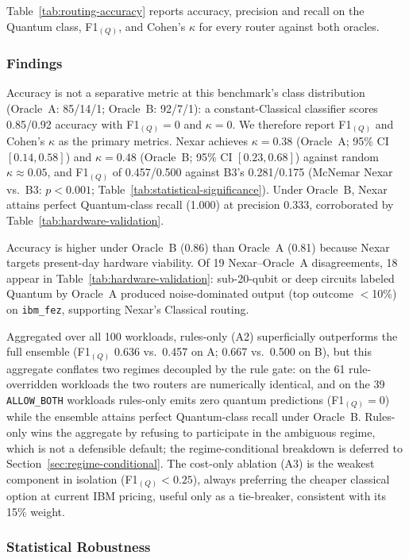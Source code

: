 \documentclass[10pt,conference]{IEEEtran}
\begin{document}
Table~\ref{tab:routing-accuracy} reports accuracy, precision and recall on the Quantum class, F1$_{(Q)}$, and Cohen's $\kappa$ for every router against both oracles.



\subsubsection{Findings}
Accuracy is not a separative metric at this benchmark's class distribution (Oracle~A: 85/14/1; Oracle~B: 92/7/1): a constant-Classical classifier scores 0.85/0.92 accuracy with F1$_{(Q)}{=}0$ and $\kappa{=}0$. We therefore report F1$_{(Q)}$ and Cohen's $\kappa$ as the primary metrics. Nexar achieves $\kappa = 0.38$ (Oracle~A; 95\% CI $[0.14, 0.58]$) and $\kappa = 0.48$ (Oracle~B; 95\% CI $[0.23, 0.68]$) against random $\kappa \approx 0.05$, and F1$_{(Q)}$ of 0.457/0.500 against B3's 0.281/0.175 (McNemar Nexar vs.\ B3: $p{<}0.001$; Table~\ref{tab:statistical-significance}). Under Oracle~B, Nexar attains perfect Quantum-class recall (1.000) at precision 0.333, corroborated by Table~\ref{tab:hardware-validation}.

Accuracy is higher under Oracle~B (0.86) than Oracle~A (0.81) because Nexar targets present-day hardware viability. Of 19 Nexar--Oracle~A disagreements, 18 appear in Table~\ref{tab:hardware-validation}: sub-20-qubit or deep circuits labeled Quantum by Oracle~A produced noise-dominated output (top outcome $<$10\%) on \texttt{ibm\_fez}, supporting Nexar's Classical routing.

Aggregated over all 100 workloads, rules-only (A2) superficially outperforms the full ensemble (F1$_{(Q)}$ 0.636 vs.\ 0.457 on A; 0.667 vs.\ 0.500 on B), but this aggregate conflates two regimes decoupled by the rule gate: on the 61 rule-overridden workloads the two routers are numerically identical, and on the 39 \texttt{ALLOW\_BOTH} workloads rules-only emits zero quantum predictions (F1$_{(Q)}{=}0$) while the ensemble attains perfect Quantum-class recall under Oracle~B. Rules-only wins the aggregate by refusing to participate in the ambiguous regime, which is not a defensible default; the regime-conditional breakdown is deferred to Section~\ref{sec:regime-conditional}. The cost-only ablation (A3) is the weakest component in isolation (F1$_{(Q)}{<}0.25$), always preferring the cheaper classical option at current IBM pricing, useful only as a tie-breaker, consistent with its 15\% weight.

\subsubsection{Statistical Robustness}\label{sec:statistical-robustness}
\end{document}
